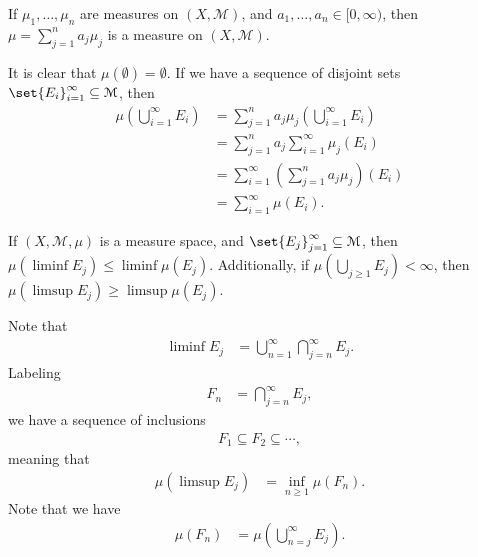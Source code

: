 \documentclass[10pt]{mypackage}
\begin{document}
\begin{exercise}[Exercise 7]
  If $\mu_1,\dots,\mu_n$ are measures on $\left(X,\mathcal{M}\right)$, and $a_1,\dots,a_n\in [0,\infty)$, then $\mu = \sum_{j=1}^{n}a_j\mu_j$ is a measure on $\left(X,\mathcal{M}\right)$.
\end{exercise}
\begin{solution}
  It is clear that $\mu\left(\emptyset\right) = \emptyset$. If we have a sequence of disjoint sets $\set{E_i}_{i=1}^{\infty}\subseteq \mathcal{M}$, then
  \begin{align*}
    \mu\left(\bigcup_{i=1}^{\infty}E_i\right) &= \sum_{j=1}^{n}a_j\mu_j\left(\bigcup_{i=1}^{\infty}E_i\right)\\
                                              &= \sum_{j=1}^{n}a_j\sum_{i=1}^{\infty}\mu_j\left(E_i\right)\\
                                              &= \sum_{i=1}^{\infty}\left(\sum_{j=1}^{n}a_j\mu_j\right)\left(E_i\right)\\
                                              &= \sum_{i=1}^{\infty}\mu\left(E_i\right).
  \end{align*}
  
\end{solution}
\begin{exercise}[Exercise 8]
  If $\left( X,\mathcal{M},\mu \right)$ is a measure space, and $\set{E_j}_{j=1}^{\infty}\subseteq \mathcal{M}$, then $\mu\left( \liminf E_j \right)\leq \liminf \mu\left( E_j \right)$. Additionally, if $\mu\left( \bigcup_{j\geq 1}E_j \right) < \infty$, then $\mu\left( \limsup E_j \right)\geq \limsup \mu\left( E_j \right)$.
\end{exercise}
\begin{solution}
  Note that
  \begin{align*}
    \liminf E_j &= \bigcup_{n=1}^{\infty}\bigcap_{j=n}^{\infty}E_j.
  \end{align*}
  Labeling
  \begin{align*}
    F_n &= \bigcap_{j=n}^{\infty}E_j,
  \end{align*}
  we have a sequence of inclusions
  \begin{align*}
    F_1 \subseteq F_2 \subseteq \cdots,
  \end{align*}
  meaning that
  \begin{align*}
    \mu\left( \limsup E_j \right) &= \inf_{n\geq 1}\mu\left( F_n \right).
  \end{align*}
  Note that we have
  \begin{align*}
    \mu\left( F_n \right) &= \mu\left( \bigcup_{n=j}^{\infty}E_j \right).
  \end{align*}
  
\end{solution}
\end{document}
